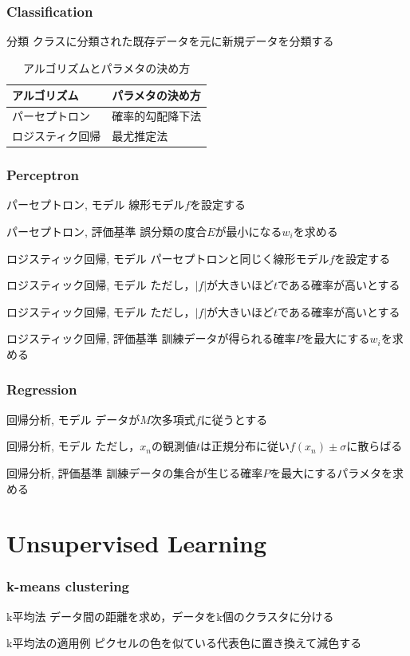 \documentclass[dvipdfmx,platex]{beamer}
\begin{document}
\section{Classification}
\begin{frame}{分類}
  クラスに分類された既存データを元に新規データを分類する
  \begin{table}
    \caption{{\mgfamily アルゴリズムとパラメタの決め方}}
    \begin{tabular}{@{} ll @{}}
      \toprule
      アルゴリズム &パラメタの決め方\\
      \midrule
      パーセプトロン & 確率的勾配降下法\\
      ロジスティク回帰 & 最尤推定法\\
      \bottomrule
    \end{tabular}
  \end{table}
\end{frame}
\section{Perceptron}
\begin{frame}{パーセプトロン, モデル}
  線形モデル$f$を設定する
\end{frame}
\begin{frame}{パーセプトロン, 評価基準}
  誤分類の度合$E$が最小になる$w_i$を求める
\end{frame}
\begin{frame}{ロジスティック回帰, モデル}
  パーセプトロンと同じく線形モデル$f$を設定する
\end{frame}
\begin{frame}{ロジスティック回帰, モデル}
  ただし，$|f|$が大きいほど$t$である確率が高いとする
\end{frame}
\begin{frame}{ロジスティック回帰, モデル}
  ただし，$|f|$が大きいほど$t$である確率が高いとする
\end{frame}
\begin{frame}{ロジスティック回帰, 評価基準}
  訓練データが得られる確率$P$を最大にする$w_i$を求める
\end{frame}
\section{Regression}
\begin{frame}{回帰分析, モデル}
  データが$M$次多項式$f$に従うとする
\end{frame}
\begin{frame}{回帰分析, モデル}
  ただし，$x_n$の観測値$t$は正規分布に従い$f(x_n)\pm\sigma$に散らばる  
\end{frame}
\begin{frame}{回帰分析, 評価基準}
  訓練データの集合が生じる確率$P$を最大にするパラメタを求める
\end{frame}
\part{Unsupervised Learning}
\section{k-means clustering}
\begin{frame}{k平均法}
  データ間の距離を求め，データをk個のクラスタに分ける
\end{frame}
\begin{frame}{k平均法の適用例}
  ピクセルの色を似ている代表色に置き換えて減色する
\end{frame}
\end{document}
